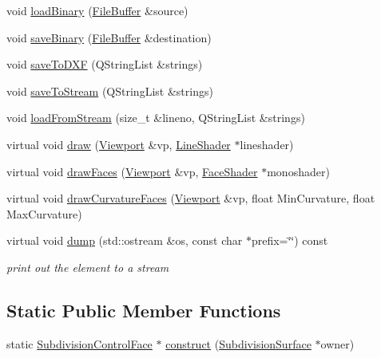 \begin{DoxyCompactItemize}
\item 
void \hyperlink{classShipCAD_1_1SubdivisionControlFace_aa5ba43707787cde6e99cd645708e9200}{load\-Binary} (\hyperlink{classShipCAD_1_1FileBuffer}{File\-Buffer} \&source)
\item 
void \hyperlink{classShipCAD_1_1SubdivisionControlFace_a562b877e868dbd86ffe2c864232e1b78}{save\-Binary} (\hyperlink{classShipCAD_1_1FileBuffer}{File\-Buffer} \&destination)
\item 
void \hyperlink{classShipCAD_1_1SubdivisionControlFace_aecc7636c397ca5669cf7ddb995feac03}{save\-To\-D\-X\-F} (Q\-String\-List \&strings)
\item 
void \hyperlink{classShipCAD_1_1SubdivisionControlFace_a8a618958b27b97dd6da2473e130d7a8e}{save\-To\-Stream} (Q\-String\-List \&strings)
\item 
void \hyperlink{classShipCAD_1_1SubdivisionControlFace_ae06e29e54f93c529875bbd66b32ad3e7}{load\-From\-Stream} (size\-\_\-t \&lineno, Q\-String\-List \&strings)
\item 
virtual void \hyperlink{classShipCAD_1_1SubdivisionControlFace_ac253493bccd91108d936b651e72b46f8}{draw} (\hyperlink{classShipCAD_1_1Viewport}{Viewport} \&vp, \hyperlink{classShipCAD_1_1LineShader}{Line\-Shader} $\ast$lineshader)
\item 
virtual void \hyperlink{classShipCAD_1_1SubdivisionControlFace_a38631a5e4c99d1d183d61a0fe3fb47ed}{draw\-Faces} (\hyperlink{classShipCAD_1_1Viewport}{Viewport} \&vp, \hyperlink{classShipCAD_1_1FaceShader}{Face\-Shader} $\ast$monoshader)
\item 
virtual void \hyperlink{classShipCAD_1_1SubdivisionControlFace_aaf9226150996743d8d2ea560083ad1d8}{draw\-Curvature\-Faces} (\hyperlink{classShipCAD_1_1Viewport}{Viewport} \&vp, float Min\-Curvature, float Max\-Curvature)
\item 
virtual void \hyperlink{classShipCAD_1_1SubdivisionControlFace_a947868fba3e9bb6c587847fb9245c9ff}{dump} (std\-::ostream \&os, const char $\ast$prefix=\char`\"{}\char`\"{}) const 
\begin{DoxyCompactList}\small\item\em print out the element to a stream \end{DoxyCompactList}\end{DoxyCompactItemize}
\subsection*{Static Public Member Functions}
\begin{DoxyCompactItemize}
\item 
static \hyperlink{classShipCAD_1_1SubdivisionControlFace}{Subdivision\-Control\-Face} $\ast$ \hyperlink{classShipCAD_1_1SubdivisionControlFace_a4117f55ab3ec27bebd933f2992bc5dcd}{construct} (\hyperlink{classShipCAD_1_1SubdivisionSurface}{Subdivision\-Surface} $\ast$owner)
\end{DoxyCompactItemize}
